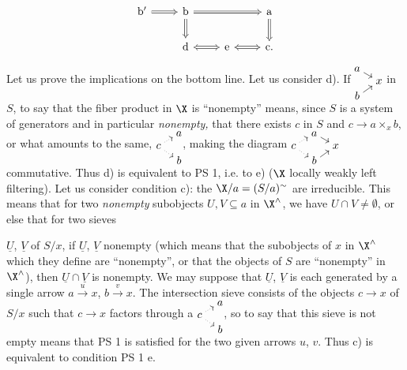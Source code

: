 
\[
\begin{tikzcd}
\mathrm{b}' \arrow[r, Rightarrow] & \mathrm{b} \arrow[rr, Rightarrow] \arrow[d, Rightarrow] & & \mathrm{a} \arrow[d, Rightarrow] \\
 & \mathrm{d} \arrow[r, Leftrightarrow] & \mathrm{e} \arrow[r, Leftrightarrow] & \mathrm{c}.
\end{tikzcd}
\]

Let us prove the implications on the bottom line. Let us consider d). If $\begin{tikzcd}[cramped, row sep=0.1em, column sep=0.8em, baseline=(current bounding box.center)] a \arrow[dr] & \\ & x \\ b \arrow[ur] & \end{tikzcd}$ in $S$, to say that the fiber product in $\X$ is ``nonempty'' means, since $S$ is a system of generators and in particular \textit{nonempty,} that there exists $c$ in $S$ and $c\longrightarrow a\times_x b$, or what amounts to the same, $\begin{tikzcd}[cramped, row sep=0.1em, column sep=0.8em, baseline=(current bounding box.center)] & a \\ c \arrow[ur, dotted] \arrow[dr, dotted] & \\ & b \end{tikzcd}$, making the diagram $\begin{tikzcd}[cramped, row sep=0.1em, column sep=0.8em, baseline=(current bounding box.center)] & a \arrow[dr] & \\ c \arrow[ur, dotted] \arrow[dr, dotted] & & x \\ & b \arrow[ur] & \end{tikzcd}$ commutative. Thus d) is equivalent to PS 1, i.e. to e) ($\X$ locally weakly left filtering). Let us consider condition c): the $\X/a=(S/a)^\sim$ are irreducible. This means that for two \textit{nonempty} subobjects $U,V\subseteq a$ in $\X^\wedge$, we have $U\cap V\neq\emptyset$, or else that for two sieves

$\underline{U}$, $\underline{V}$ of $S/x$, if $\underline{U}$, $\underline{V}$ nonempty (which means that the subobjects of $x$ in $\X^\wedge$ which they define are ``nonempty'', or that the objects of $S$ are ``nonempty'' in $\X^\wedge$), then $\underline{U}\cap\underline{V}$ is nonempty. We may suppose that $\underline{U}$, $\underline{V}$ is each generated by a single arrow $a\xrightarrow{u}x$, $b\xrightarrow{v}x$. The intersection sieve consists of the objects $c\longrightarrow x$ of $S/x$ such that $c\longrightarrow x$ factors through a $\begin{tikzcd}[cramped, row sep=0.1em, column sep=0.8em, baseline=(current bounding box.center)] & a \\ c \arrow[ur, dotted] \arrow[dr, dotted] & \\ & b \end{tikzcd}$, so to say that this sieve is not empty means that PS 1 is satisfied for the two given arrows $u$, $v$. Thus c) is equivalent to condition PS 1 e.

